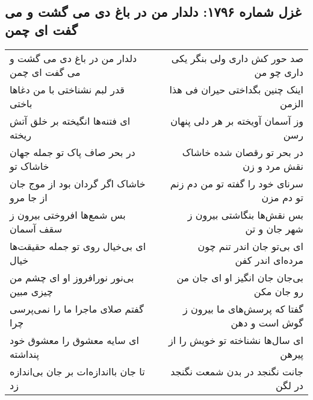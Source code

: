 \begin{center}
\section*{غزل شماره ۱۷۹۶: دلدار من در باغ دی می گشت و می گفت ای چمن}
\label{sec:1796}
\begin{longtable}{l p{0.5cm} r}
دلدار من در باغ دی می گشت و می گفت ای چمن
&&
صد حور کش داری ولی بنگر یکی داری چو من
\\
قدر لبم نشناختی با من دغاها باختی
&&
اینک چنین بگداختی حیران فی هذا الزمن
\\
ای فتنه‌ها انگیخته بر خلق آتش ریخته
&&
وز آسمان آویخته بر هر دلی پنهان رسن
\\
در بحر صاف پاک تو جمله جهان خاشاک تو
&&
در بحر تو رقصان شده خاشاک نقش مرد و زن
\\
خاشاک اگر گردان بود از موج جان از جا مرو
&&
سرنای خود را گفته تو من دم زنم تو دم مزن
\\
بس شمع‌ها افروختی بیرون ز سقف آسمان
&&
بس نقش‌ها بنگاشتی بیرون ز شهر جان و تن
\\
ای بی‌خیال روی تو جمله حقیقت‌ها خیال
&&
ای بی‌تو جان اندر تنم چون مرده‌ای اندر کفن
\\
بی‌نور نورافروز او ای چشم من چیزی مبین
&&
بی‌جان جان انگیز او ای جان من رو جان مکن
\\
گفتم صلای ماجرا ما را نمی‌پرسی چرا
&&
گفتا که پرسش‌های ما بیرون ز گوش است و دهن
\\
ای سایه معشوق را معشوق خود پنداشته
&&
ای سال‌ها نشناخته تو خویش را از پیرهن
\\
تا جان بااندازه‌ات بر جان بی‌اندازه زد
&&
جانت نگنجد در بدن شمعت نگنجد در لگن
\\
\end{longtable}
\end{center}
